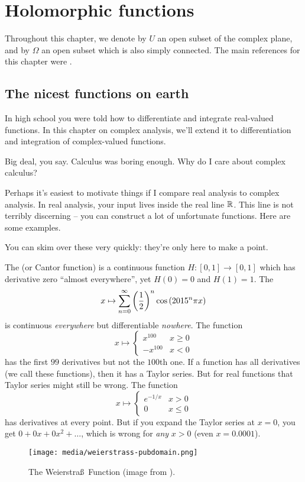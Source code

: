 \chapter{Holomorphic functions}
Throughout this chapter, we denote by $U$ an open subset of the complex plane,
and by $\Omega$ an open subset which is also simply connected.
The main references for this chapter were \cite{ref:dartmouth,ref:bak_ca}.

\section{The nicest functions on earth}
In high school you were told how to differentiate and integrate real-valued functions.
In this chapter on complex analysis,
we'll extend it to differentiation and integration of complex-valued functions.

Big deal, you say. Calculus was boring enough. Why do I care about complex calculus?

Perhaps it's easiest to motivate things if I compare real analysis to complex analysis.
In real analysis, your input lives inside the real line $\mathbb R$.
This line is not terribly discerning -- you can construct a lot of unfortunate functions.
Here are some examples.
\begin{example}
	You can skim over these very quickly: they're only here to make a point.
	\begin{enumerate}[(a)]
		\ii The  (or Cantor function)
		is a continuous function $H \colon [0,1] \to [0,1]$
		which has derivative zero ``almost everywhere'',
		yet $H(0) = 0$ and $H(1) = 1$.
		\ii The 
		\[ x \mapsto \sum_{n=0}^\infty \left( \frac{1}{2} \right)^n \cos \left( 2015^n \pi x \right) \]
		is continuous \emph{everywhere} but differentiable \emph{nowhere}.
		\ii The function
		\[
			x \mapsto
			\begin{cases}
				x^{100} & x \ge 0 \\
				-x^{100} & x < 0
			\end{cases}
		\]
		has the first $99$ derivatives but not the $100$th one.
		\ii
		If a function has all derivatives (we call these  functions),
		then it has a Taylor series.
		But for real functions that Taylor series might still be wrong. The function
		\[ x \mapsto
			\begin{cases}
				e^{-1/x} & x > 0 \\
				0 & x \le 0
			\end{cases}
		\]
		has derivatives at every point.
		But if you expand the Taylor series at $x=0$, you get $0 + 0x + 0x^2 + \dots$,
		which is wrong for \emph{any} $x > 0$ (even $x=0.0001$).
	\end{enumerate}
\end{example}
\begin{figure}[h]
	\centering
	\texttt{[image: media/weierstrass-pubdomain.png]}
	\caption{The Weierstra\ss\ Function (image from \cite{img:weierstrass}).}
\end{figure}

